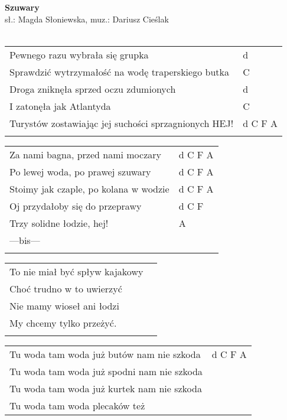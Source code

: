 \documentclass[a5paper]{article}
\begin{document}


\noindent
\fontsize{12pt}{15pt}\selectfont
\textbf{Szuwary} \\
\fontsize{8pt}{10pt}\selectfont
sł.: Magda Słoniewska, muz.: Dariusz Cieślak \\ \\
\fontsize{10pt}{12pt}\selectfont
{}
\begin{tabular}{@{}p{9.00cm}p{3cm}@{}}
\noindent
Pewnego razu wybrała się grupka & d \\
Sprawdzić wytrzymałość na wodę traperskiego butka & C \\
Droga zniknęła sprzed oczu zdumionych & d \\
I zatonęła jak Atlantyda & C \\
Turystów zostawiając jej suchości sprzagnionych	 HEJ! & d C F A \\ \\
\end{tabular}

\noindent
\begin{tabular}{@{}p{8.00cm}p{3cm}@{}}
Za nami bagna, przed nami moczary & d C F A \\
Po lewej woda, po prawej szuwary & d C F A \\
Stoimy jak czaple, po kolana w wodzie & d C F A \\
Oj przydałoby się do przeprawy & d C F \\
Trzy solidne łodzie, hej! & A \\
---bis--- \\ \\
\end{tabular}

\noindent
\begin{tabular}{@{}p{8.00cm}p{3cm}@{}}
To nie miał być spływ kajakowy \\
Choć trudno w to uwierzyć \\
Nie mamy wioseł ani łodzi \\
My chcemy tylko przeżyć. \\ \\
\end{tabular}

\noindent
\begin{tabular}{@{}p{8.00cm}p{3cm}@{}}
Tu woda tam woda już butów nam nie szkoda & d C F A \\
Tu woda tam woda już spodni nam nie szkoda\\
Tu woda tam woda już kurtek nam nie szkoda\\
Tu woda tam woda plecaków też
\end{tabular}
\end{document}
